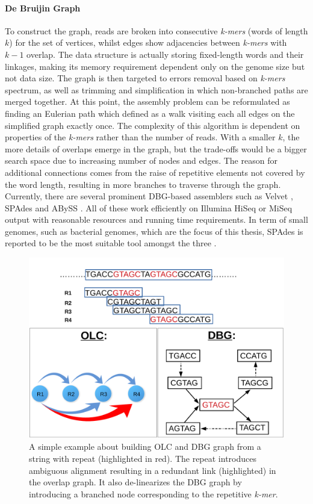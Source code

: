 \paragraph{De Bruijin Graph} To construct the graph, reads are broken into consecutive \emph{k-mers} (words of length $k$) for the set of vertices, whilst edges show adjacencies between \emph{k-mers} with $k-1$ overlap. The data structure is actually storing fixed-length words and their linkages, making its memory requirement dependent only on the genome size but not data size. The graph is then targeted to errors removal based on \emph{k-mers} spectrum, as well as trimming and simplification in which non-branched paths are merged together.
At this point, the assembly problem can be reformulated as finding an Eulerian path which defined as a walk visiting each all edges on the simplified graph exactly once. 
The complexity of this algorithm is dependent on properties of the \emph{k-mers} rather than the number of reads. With a smaller $k$, the more details of overlaps emerge in the graph, but the trade-offs would be a bigger search space due to increasing number of nodes and edges. The reason for additional connections comes from the raise of repetitive elements not covered by the word length, resulting in more branches to traverse through the graph.  
Currently, there are several prominent DBG-based assemblers such as Velvet \cite{Zerbino2008}, SPAdes \cite{BankevichNA2012} and ABySS \cite{Simpson2009}. All of these work efficiently on Illumina HiSeq or MiSeq output with reasonable resources and running time requirements. In term of small genomes, such as bacterial genomes, which are the focus of this thesis, SPAdes is reported to be the most suitable tool amongst the three \cite{Magoc2013}.

\begin{figure}[ht!]
\centering
\includegraphics[width=.8\textwidth]{images/olcdbg.pdf}
\caption[Example about building OLC and DBG graph from a string]{A simple example about building OLC and DBG graph from a string with repeat (highlighted in red). The repeat introduces ambiguous alignment resulting in a redundant link (highlighted) in the overlap graph. It also de-linearizes the DBG graph by introducing a branched node corresponding to the repetitive \emph{k-mer}.}
\label{F:olcdbg}
\end{figure}

